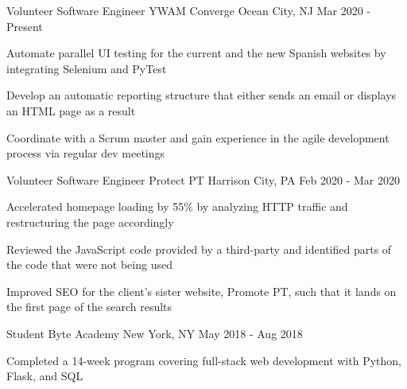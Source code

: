 

\begin{cventries}

\cventry
  {Volunteer Software Engineer} %
  {YWAM Converge} %
  {Ocean City, NJ} %
  {Mar 2020 - Present} %
  {
    \begin{cvitems} %
      \item {Automate parallel UI testing for the current and the new Spanish websites by integrating Selenium and PyTest}
      \item {Develop an automatic reporting structure that either sends an email or displays an HTML page as a result}
      \item {Coordinate with a Scrum master and gain experience in the agile development process via regular dev meetings}
    \end{cvitems}
  }

\cventry
  {Volunteer Software Engineer} %
  {Protect PT} %
  {Harrison City, PA} %
  {Feb 2020 - Mar 2020} %
  {
    \begin{cvitems} %
      \item {Accelerated homepage loading by 55\% by analyzing HTTP traffic and restructuring the page accordingly}
      \item {Reviewed the JavaScript code provided by a third-party and identified parts of the code that were not being used}
      \item {Improved SEO for the client's sister website, Promote PT, such that it lands on the first page of the search results}
    \end{cvitems}
  }

  \cventry
    {Student} %
    {Byte Academy} %
    {New York, NY} %
    {May 2018 - Aug 2018} %
    {
      \begin{cvitems} %
        \item {Completed a 14-week program covering full-stack web development with Python, Flask, and SQL}
      \end{cvitems}
    }


\end{cventries}
